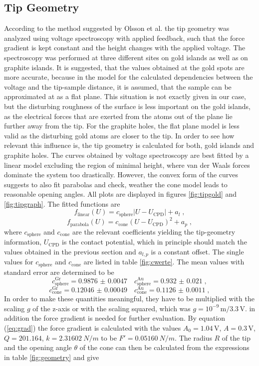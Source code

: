 \documentclass[a4paper]{scrartcl}
\numberwithin{equation}{section}
\numberwithin{figure}{section}
\numberwithin{table}{section}
\newcommand{\eq}[2]{\begin{equation}#1\label{#2}\end{equation}}
\newcommand{\Formel}[1]{(\ref{#1})}
\begin{document}
\subsection{Tip Geometry}
According to the method suggested by Olsson  et al. \cite{olsson} the tip geometry was analyzed using voltage spectroscopy with applied feedback, such that the force gradient is kept constant and the height changes with the applied voltage. The spectroscopy was performed at three different sites on gold islands as well as on graphite islands. It is suggested, that the values obtained at the gold spots are more accurate, because in the model for the calculated dependencies between the voltage and the tip-sample distance, it is assumed, that the sample can be approximated at as a flat plane. This situation is not exactly given in our case, but the disturbing roughness of the surface is less important on the gold islands, as the electrical forces that are exerted from the atoms out of the plane lie further away from the tip. For the graphite holes, the flat plane model is less valid as the disturbing gold atoms are closer to the tip. In order to see how relevant this influence is, the tip geometry is calculated for both, gold islands and graphite holes.
The curves obtained by voltage spectroscopy are best fitted by a linear model excluding the region of minimal height, where van der Waals forces dominate the system too drastically. However, the convex form of the curves suggests to also fit parabolas and check, weather the cone model leads to reasonable opening angles.
All plots are displayed in figures \ref{fig:tipgold} and \ref{fig:tipgraph}. The fitted functions are
\eq{f_\text{linear} (U) = c_\text{sphere} \lvert U - U_\text{CPD} \rvert + a_l \; , }{lin}
\eq{f_\text{parabola} (U) = c_\text{cone}  (U-U_\text{CPD})^2 +a_p \; ,}{par}
where $c_\text{sphere}$ and $c_\text{cone}$ are the relevant coefficients yielding the tip-geometry information, $U_\text{CPD}$ is the contact potential, which in principle should match the values obtained in the previous section and $a_{l,p}$ is a constant offset.
The single values for $c_\text{sphere}$ and $c_\text{cone}$ are listed in table \ref{fig:cwerte}. The mean values with standard error are determined to be
\eq{c_\text{sphere}^\text{Gr}=\SI{0.9876(47)} \quad c_\text{sphere}^\text{Au}=\SI{0.932(21)} \; ,}{}
\eq{c_\text{cone}^\text{Gr}=\SI{0.12046(49)} \quad c_\text{cone}^\text{Au}=\SI{0.1126(11)} \; ,}{}
In order to make these quantities meaningful, they have to be multiplied with the scaling $g$ of the z-axis or with the scaling squared, which was $g=10^{-9} \, \text{m}/ 3.3 \, \text{V}$. in addition the force gradient is needed for further evaluation. By equation \Formel{eq:grad} the force gradient is calculated with the values  $A_0=1.04 \, \text{V}$, $A=0.3 \, \text{V}$, $Q=201.164$, $k=\SI{2.31602}{N/m}$ to be $F'=\SI{0.05160}{N/m}$. The radius $R$ of the tip and the opening angle $\theta$ of the cone can then be calculated from the expressions in table \ref{fig:geometry} and give
\end{document}
